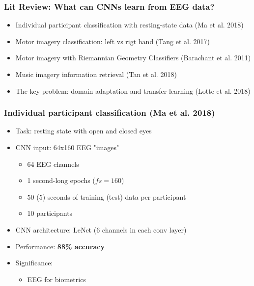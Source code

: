 \documentclass{beamer}
\begin{document}
\begin{frame}
	\frametitle{Lit Review: What can CNNs learn from EEG data?}
	
	\begin{itemize}

		\item Individual participant classification with resting-state data (Ma et al. 2018)

		\item Motor imagery classification: left vs rigt hand (Tang et al. 2017)

		\item Motor imagery with Riemannian Geometry Classifiers (Barachant et al. 2011)

		\item Music imagery information retrieval (Tan et al. 2018)
		
		\item The key problem: domain adaptation and transfer learning (Lotte et al. 2018) 

	\end{itemize}

\end{frame}

\begin{frame}
	\frametitle{Individual participant classification (Ma et al. 2018)}
	
	\begin{itemize}

		\item Task: resting state with open and closed eyes

		\item CNN input: 64x160 EEG "images" 
		\begin{itemize}
			\item 64 EEG channels
			\item 1 second-long epochs ($fs = 160$)
			\item 50 (5) seconds of training (test) data per participant 
			\item 10 participants
		\end{itemize}

		\item CNN architecture: LeNet (6 channels in each conv layer)
	
		\item Performance: \textbf{88\% accuracy}

		\item Significance: 
		\begin{itemize}
			\item EEG for biometrics
		\end{itemize}

	\end{itemize}

\end{frame}
\end{document}
